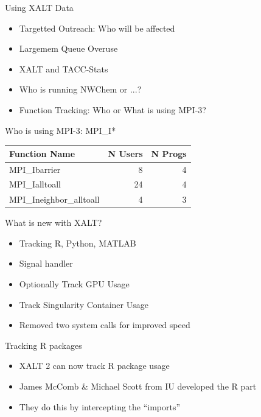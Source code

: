 \documentclass{beamer}
\begin{document}
\begin{frame}{Using XALT Data}
  \begin{itemize}
    \item Targetted Outreach: Who will be affected
    \item Largemem Queue Overuse
    \item XALT and TACC-Stats
    \item Who is running NWChem or ...?
    \item Function Tracking: Who or What is using MPI-3?      
  \end{itemize}
\end{frame}

\begin{frame}{Who is using MPI-3: MPI\_I*}
    \begin{tabular}{|l|r|r|}
        \hline
        Function Name            & N Users    & N Progs \\\hline\hline
        MPI\_Ibarrier            &  8         & 4       \\\hline
        MPI\_Ialltoall           & 24         & 4       \\\hline
        MPI\_Ineighbor\_alltoall &  4         & 3       \\\hline
    \end{tabular}

\end{frame}

\begin{frame}{What is new with XALT?}
  \begin{itemize}
    \item Tracking R, Python, MATLAB
    \item Signal handler
    \item Optionally Track GPU Usage
    \item Track Singularity Container Usage
    \item Removed two system calls for improved speed
  \end{itemize}
\end{frame}

\begin{frame}{Tracking R packages}
  \begin{itemize}
    \item XALT 2 can now track R package usage
    \item James McComb \& Michael Scott from IU developed the R part
    \item They do this by intercepting the ``imports''
  \end{itemize}
\end{frame}
\end{document}
